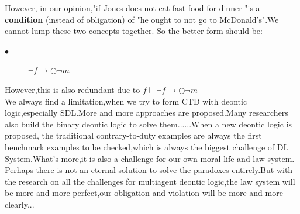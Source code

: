 \documentclass{article}
\begin{document}
However, in our opinion,"if Jones does not eat fast food for dinner "is a \textbf{condition} (instead of obligation) of "he ought to not go to McDonald's".We cannot lump these two concepts together.
So the better form should be:
\begin{description}
\item[$\bullet$]$ \neg f \rightarrow \bigcirc \neg m$
\end{description}
However,this is also redundant due to $f \vDash\neg f \rightarrow \bigcirc \neg m $\\We always find a limitation,when we try to form CTD with deontic logic,especially SDL.More and more approaches are proposed.Many researchers also build the binary deontic logic to solve them......When a new deontic logic is proposed, the traditional contrary-to-duty examples are always the first benchmark examples to be checked,which is always the biggest challenge of DL System.What's more,it is also a challenge for our own moral life and law system.
Perhaps there is not an eternal solution to solve the paradoxes entirely.But with the research on all the challenges for multiagent deontic logic,the law system will be more and more perfect,our obligation and violation will be more and more clearly... 



\end{document}
